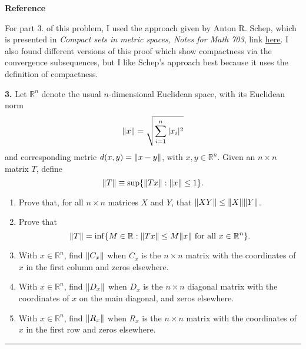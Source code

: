 \documentclass[11pt]{article}
\begin{document}
\noindent \textbf{Reference}

For part 3. of this problem, I used the approach given by Anton R. Schep, which is presented in \textit{Compact sets in metric spaces, Notes for Math 703}, link \href{http://people.math.sc.edu/schep/compactmetric.pdf}{\underline{here}}. I also found different versions of this proof which show compactness via the convergence subsequences, but I like Schep's approach best because it uses the definition of compactness.  




\newpage


\noindent \textbf{3.} Let $\mathbb{R}^n$ denote the usual $n$-dimensional Euclidean space,   with its Euclidean  norm
$$ \norm{x} = \sqrt{ \sum_{i=1}^n |x_i|^2}$$ and corresponding metric $d(x,y) = \norm{x-y}$,  with    $ x,y \in \mathbb{R}^n$.
Given an $n \times n$ matrix $T$,  define 
$$ \norm{T} \equiv \sup  \{ \norm{Tx} : \norm{x} \leq 1\} .$$

\begin{enumerate}
	\item  Prove that,   for all $n \times n$ matrices $X$ and $Y$,  that $\norm{XY} \leq \norm{X}  \norm{Y}$.
	\item  Prove that
	$$ \norm{T}=  \inf  \{ M \in \mathbb{R} : \norm{T x } \leq M \norm{ x }   \mbox{ for all } x \in \mathbb{R}^n \}. $$
	\item  With $x \in \mathbb{R}^n$,   find $ \norm{C_x} $ when $C_x$ is the $n \times n$ matrix with the coordinates of $x$ in the first column and zeros elsewhere.
	\item   With $x \in \mathbb{R}^n$,   find $ \norm{D_x} $ when $D_x$ is the $n \times n$ diagonal matrix with the coordinates of  $x$  on the main diagonal,
	and zeros elsewhere.
	\item  With $x \in \mathbb{R}^n$,   find $ \norm{R_x} $ when $R_x$ is the $n \times n$ matrix with the coordinates of $x$ in the first row and zeros elsewhere.
	
\end{enumerate}

\hrule
\end{document}
